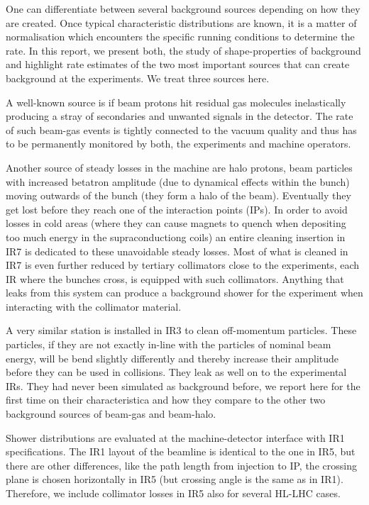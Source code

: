 One can differentiate between several background sources depending on how they are created. Once typical characteristic distributions are known, it is a matter of normalisation which encounters the specific running conditions to determine the rate. In this report, we present both, the study of shape-properties of background and highlight rate estimates of the two most important sources that can create background at the experiments. We treat three sources here.

A well-known source is if beam protons hit residual gas molecules inelastically producing a stray of secondaries and unwanted signals in the detector. The rate of such beam-gas events is tightly connected to the vacuum quality and thus has to be permanently monitored by both, the experiments and machine operators.

Another source of steady losses in the machine are halo protons, beam particles with increased betatron amplitude (due to dynamical effects within the bunch) moving outwards of the bunch (they form a halo of the beam). Eventually they get lost before they reach one of the interaction points (IPs). In order to avoid losses in cold areas (where they can cause magnets to quench when depositing too much energy in the supraconductiong coils) an entire cleaning insertion in IR7 is dedicated to these unavoidable steady losses. Most of what is cleaned in IR7 is even further reduced by tertiary collimators close to the experiments, each IR where the bunches cross, is equipped with such collimators. Anything that leaks from this system can produce a background shower for the experiment when interacting with the collimator material. 

A very similar station is installed in IR3 to clean off-momentum particles. These particles, if they are not exactly in-line with the particles of nominal beam energy, will be bend slightly differently and thereby increase their amplitude before they can be used in collisions. They leak as well on to the experimental IRs. They had never been simulated as background before, we report here for the first time on their characteristica and how they compare to the other two background sources of beam-gas and beam-halo. 

Shower distributions are evaluated at the machine-detector interface with IR1 specifications. The IR1 layout of the beamline is identical to the one in IR5, but there are other differences, like the path length from injection to IP, the crossing plane is chosen horizontally in IR5 (but crossing angle is the same as in IR1). Therefore, we include collimator losses in IR5 also for several HL-LHC cases.
